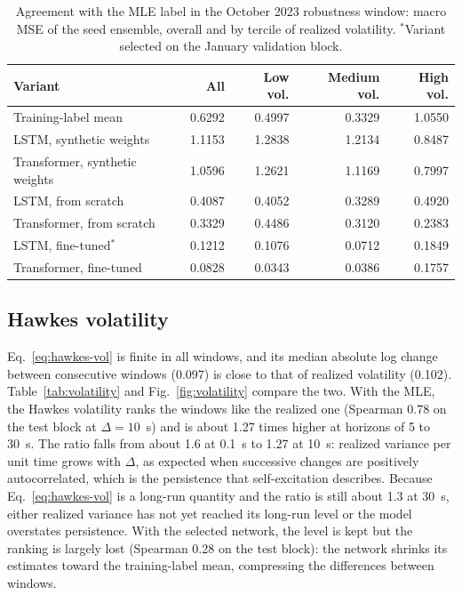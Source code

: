 \documentclass[preprint,12pt,authoryear]{elsarticle}
\begin{document}
\begin{table}[t]
\centering
\caption{Agreement with the MLE label in the October 2023 robustness window: macro MSE of
the seed ensemble, overall and by tercile of realized volatility. $^{\ast}$Variant selected
on the January validation block.}
\label{tab:october}
\small
\begin{tabular}{lrrrr}
\toprule
Variant & All & Low vol. & Medium vol. & High vol.\\
\midrule
Training-label mean & 0.6292 & 0.4997 & 0.3329 & 1.0550\\
LSTM, synthetic weights & 1.1153 & 1.2838 & 1.2134 & 0.8487\\
Transformer, synthetic weights & 1.0596 & 1.2621 & 1.1169 & 0.7997\\
LSTM, from scratch & 0.4087 & 0.4052 & 0.3289 & 0.4920\\
Transformer, from scratch & 0.3329 & 0.4486 & 0.3120 & 0.2383\\
LSTM, fine-tuned$^{\ast}$ & 0.1212 & 0.1076 & 0.0712 & 0.1849\\
Transformer, fine-tuned & 0.0828 & 0.0343 & 0.0386 & 0.1757\\
\bottomrule
\end{tabular}
\end{table}

\subsection{Hawkes volatility}

Eq.~\eqref{eq:hawkes-vol} is finite in all windows, and its median absolute
log change between consecutive windows (0.097) is close to that of realized volatility
(0.102). Table~\ref{tab:volatility} and Fig.~\ref{fig:volatility} compare the two. With the
MLE, the Hawkes volatility ranks the windows like the realized one (Spearman 0.78 on the
test block at $\Delta=10$~s) and is about 1.27 times higher at horizons of 5 to 30~s. The
ratio falls from about 1.6 at 0.1~s to 1.27 at 10~s: realized variance per unit time grows
with $\Delta$, as expected when successive changes are positively autocorrelated, which is the
persistence that self-excitation describes. Because Eq.~\eqref{eq:hawkes-vol} is a long-run
quantity and the ratio is still about 1.3 at 30~s, either realized variance has not yet
reached its long-run level or the model overstates persistence. With the selected network,
the level is kept but the ranking is largely lost (Spearman 0.28 on the test block): the
network shrinks its estimates toward the training-label mean, compressing the differences
between windows.
\end{document}
